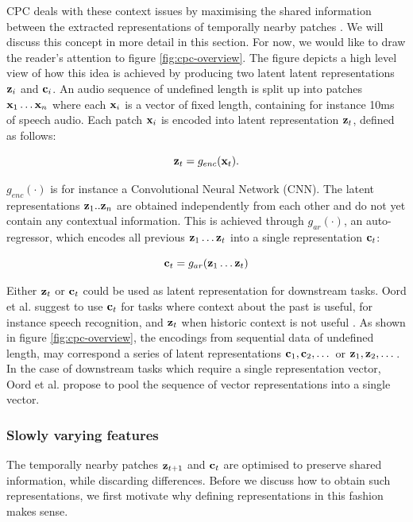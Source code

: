 	CPC deals with these context issues by maximising the shared information between the extracted representations of temporally nearby patches \cite{lowePuttingEndEndtoEnd2020}. We will discuss this concept in more detail in this section. For now, we would like to draw the reader's attention to figure \ref{fig:cpc-overview}. The figure depicts a high level view of how this idea is achieved by producing two latent latent representations $\mathbf{z}_i$ and $\mathbf{c}_i$. An audio sequence of undefined length is split up into patches $\mathbf{x}_1 \dots \mathbf{x}_n$ where each $\mathbf{x}_i$ is a vector of fixed length, containing for instance 10ms of speech audio. Each patch $\mathbf{x}_i$ is encoded into latent representation $\mathbf{z}_t$, defined as follows:
	
	$$
	\mathbf{z}_t = g_{enc}(\mathbf{x}_t) .
	$$
	
	$g_{enc}( \cdot )$ is for instance a Convolutional Neural Network (CNN). The latent representations $\mathbf{z}_1..\mathbf{z}_n$ are obtained independently from each other and do not yet contain any contextual information. This is achieved through $g_{ar}( \cdot )$, an auto-regressor, which encodes all previous $\mathbf{z}_1 \dots \mathbf{z}_t$ into a single representation $\mathbf{c}_t$:
	
	$$
	\mathbf{c}_t = g_{ar}(\mathbf{z}_1 \dots \mathbf{z}_t)
	$$
	
	Either $\mathbf{z}_t$ or $\mathbf{c}_t$ could be used as latent representation for downstream tasks. Oord et al. suggest to use $\mathbf{c}_t$ for tasks where context about the past is useful, for instance speech recognition, and $\mathbf{z}_t$ when historic context is not useful \cite{oordRepresentationLearningContrastive2019}. As shown in figure \ref{fig:cpc-overview}, the encodings from sequential data of undefined length, may correspond a series of latent representations $\mathbf{c}_1, \mathbf{c}_2, \dots $ or $\mathbf{z}_1, \mathbf{z}_2, \dots $. In the case of downstream tasks which require a single representation vector, Oord et al. propose to pool the sequence of vector representations into a single vector.
	

\subsubsection{Slowly varying features}
	The temporally nearby patches $\mathbf{z}_{t+1}$ and $\mathbf{c}_t$ are optimised to preserve shared information, while discarding differences. Before we discuss how to obtain such representations, we first motivate why defining representations in this fashion makes sense.
	
